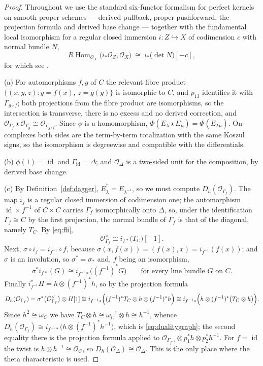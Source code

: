 \documentclass[11pt]{amsart}
\theoremstyle{definition}
\theoremstyle{remark}
\newcommand{\Hom}{\operatorname{Hom}}
\newcommand{\id}{\operatorname{id}}
\begin{document}
\begin{proof}
Throughout we use the standard six-functor formalism for perfect kernels on
smooth proper schemes --- derived pullback, proper pushforward, the projection
formula and derived base change \cite{SGA6} --- together with the fundamental
local isomorphism for a regular closed immersion $i:Z\hookrightarrow X$ of
codimension $c$ with normal bundle $N$,
\begin{equation}\label{eq:fli}
R\!\Hom_{\mathcal O_X}\bigl(i_{*}\mathcal O_Z,\mathcal O_X\bigr)
\ \cong\ i_{*}\bigl(\det N\bigr)[-c],
\end{equation}
for which see \cite[Ch.~III, \S7]{HartshorneRD}.

(a)  For automorphisms $f,g$ of $C$ the relevant fibre product
$\{(x,y,z):y=f(x),\,z=g(y)\}$ is isomorphic to $C$, and $p_{13}$ identifies it
with $\Gamma_{g\circ f}$; both projections from the fibre product are
isomorphisms, so the intersection is transverse, there is no excess and no
derived correction, and $\mathcal O_{\Gamma_f}\star\mathcal O_{\Gamma_g}\cong
\mathcal O_{\Gamma_{g\circ f}}$.  Since $\phi$ is a homomorphism,
$\Phi(E_{\lambda}\star E_{\mu})=\Phi(E_{\lambda\mu})$.  On complexes both sides
are the term-by-term totalization with the same Koszul signs, so the
isomorphism is degreewise and compatible with the differentials.

(b)  $\phi(1)=\id$ and $\Gamma_{\id}=\Delta$; and $\mathcal O_{\Delta}$ is a
two-sided unit for the composition, by derived base change.

(c)  By Definition~\ref{def:dagger}, $E_{\lambda}^{\dagger}=E_{\lambda^{-1}}$,
so we must compute $D_h(\mathcal O_{\Gamma_f})$.  The map $i_f$ is a regular
closed immersion of codimension one; the automorphism $\id\times f^{-1}$ of
$C\times C$ carries $\Gamma_f$ isomorphically onto $\Delta$, so, under the
identification $\Gamma_f\cong C$ by the first projection, the normal bundle of
$\Gamma_f$ is that of the diagonal, namely $T_C$.  By \eqref{eq:fli},
\[
\mathcal O_{\Gamma_f}^{\vee}\cong i_{f*}\bigl(T_C\bigr)[-1].
\]
Next, $\sigma\circ i_f=i_{f^{-1}}\circ f$, because
$\sigma(x,f(x))=(f(x),x)=i_{f^{-1}}(f(x))$; and $\sigma$ is an involution, so
$\sigma^{*}=\sigma_{*}$ and, $f$ being an isomorphism,
\[
\sigma^{*}i_{f*}(G)\cong i_{f^{-1}*}\bigl((f^{-1})^{*}G\bigr)
\qquad\text{for every line bundle }G\text{ on }C .
\]
Finally $i_{f^{-1}}^{*}H=h\otimes(f^{-1})^{*}h$, so by the projection formula
\[
D_h(\mathcal O_{\Gamma_f})
=\sigma^{*}\bigl(\mathcal O_{\Gamma_f}^{\vee}\bigr)\otimes H[1]
\cong i_{f^{-1}*}\Bigl((f^{-1})^{*}T_C\otimes h\otimes(f^{-1})^{*}h\Bigr)
\cong i_{f^{-1}*}\Bigl(h\otimes(f^{-1})^{*}\bigl(T_C\otimes h\bigr)\Bigr).
\]
Since $h^{2}\cong\omega_C$ we have $T_C\otimes h\cong\omega_C^{-1}\otimes
h\cong h^{-1}$, whence
$D_h(\mathcal O_{\Gamma_f})\cong i_{f^{-1}*}\bigl(h\otimes
(f^{-1})^{*}h^{-1}\bigr)$, which is \eqref{eq:dualitygraph}; the second
equality there is the projection formula applied to
$\mathcal O_{\Gamma_{f^{-1}}}\otimes p_1^{*}h\otimes p_2^{*}h^{-1}$.  For
$f=\id$ the twist is $h\otimes h^{-1}\cong\mathcal O_C$, so
$D_h(\mathcal O_{\Delta})\cong\mathcal O_{\Delta}$.  This is the only place
where the theta characteristic is used.


\end{proof}
\end{document}
